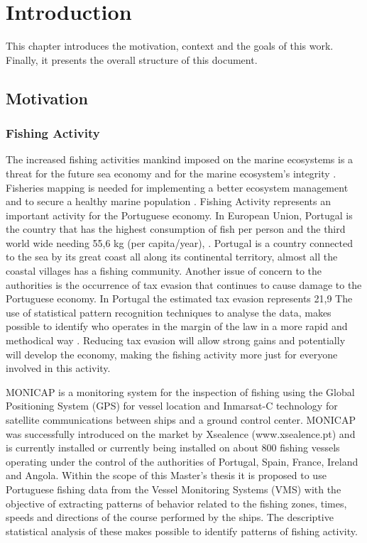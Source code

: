 % 
%  
%
\chapter{Introduction}
\label{cha:introduction}
This chapter introduces the motivation, context and the goals of this work. Finally, it presents the overall structure of this document.

\section{Motivation} %
\label{sec:motivation}

\subsection{Fishing Activity} %
\label{sub:fishing_activity}
The increased fishing activities mankind imposed on the marine ecosystems is a threat for the future sea economy and for the marine ecosystem’s integrity \cite{AgardyEffects}.\\
Fisheries mapping is needed for implementing a better ecosystem management and to secure a healthy marine population \cite{AlfredImperative}.
Fishing Activity represents an important activity for the Portuguese economy. In European Union, Portugal is the country that has the highest consumption of fish per person and the third world wide needing 55,6 kg (per capita/year), \cite{WEBSITE:ConsumoPescasPortugal}. Portugal is a country connected to the sea by its great coast all along its continental territory, almost all the coastal villages has a fishing community.
Another issue of concern to the authorities is the occurrence of tax evasion that continues to cause damage to the Portuguese economy. In Portugal the estimated tax evasion represents 21,9%
The use of statistical pattern recognition techniques to analyse the data, makes possible to identify who operates in the margin of the law in a more rapid and methodical way \cite{ShuklaBigData}. Reducing tax evasion will allow strong gains and potentially will develop the economy, making the fishing activity more just for everyone involved in this activity.

MONICAP is a monitoring system for the inspection of fishing using the Global Positioning System (GPS) for vessel location and Inmarsat-C technology for satellite communications between ships and a ground control center. MONICAP was successfully introduced on the market by Xsealence (www.xsealence.pt) and is currently installed or currently being installed on about 800 fishing vessels operating under the control of the authorities of Portugal, Spain, France, Ireland and Angola. Within the scope of this Master's thesis it is proposed to use Portuguese fishing data from the Vessel Monitoring Systems (VMS) with the objective of extracting patterns of behavior related to the fishing zones, times, speeds and directions of the course performed by the ships. The descriptive statistical analysis of these makes possible to identify patterns of fishing activity. 

